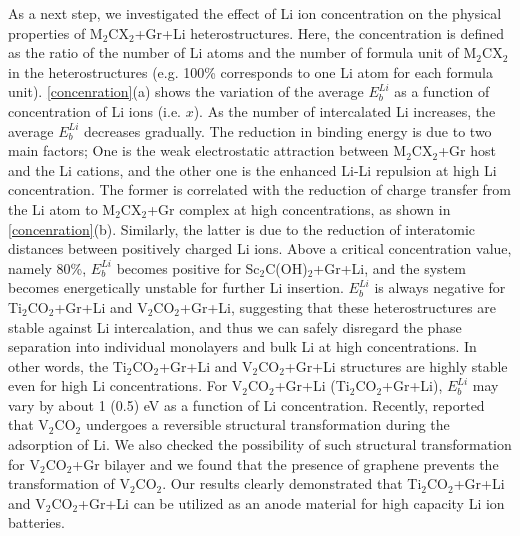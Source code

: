 As a next step, we investigated the effect of Li ion concentration on the physical properties of M$_2$CX$_2$+Gr+Li heterostructures. Here, the concentration is defined as the ratio of the number of Li atoms and the number of formula unit of M$_2$CX$_2$ in the heterostructures (e.g. 100\% corresponds to one Li atom for each formula unit). \autoref{concenration}(a) shows the variation of the average $E_{b}^{Li}$ as a function of concentration of Li ions (i.e. $x$). As the number of intercalated Li increases,  the average $E_{b}^{Li}$ decreases gradually. The reduction in binding energy is due to two main factors; One is the weak electrostatic attraction between M$_2$CX$_2$+Gr host and the Li cations, and the other one is the enhanced Li-Li repulsion at high Li concentration. The former is correlated with the reduction of charge transfer from the Li atom to M$_2$CX$_2$+Gr complex at high concentrations, as shown in \autoref{concenration}(b). Similarly, the latter is due to the reduction of interatomic distances between positively charged Li ions. Above a critical concentration value, namely 80\%,  $E_{b}^{Li}$ becomes positive for Sc$_2$C(OH)$_2$+Gr+Li, and the system becomes energetically unstable for further Li insertion. $E_{b}^{Li}$ is always negative for Ti$_2$CO$_2$+Gr+Li and V$_2$CO$_2$+Gr+Li, suggesting that these heterostructures are stable against Li intercalation, and thus we can safely disregard the phase separation into individual monolayers and bulk Li at high concentrations. In other words, the Ti$_2$CO$_2$+Gr+Li and V$_2$CO$_2$+Gr+Li structures are highly stable even for high Li concentrations. For V$_2$CO$_2$+Gr+Li (Ti$_2$CO$_2$+Gr+Li), $E_{b}^{Li}$ may vary by about 1 (0.5) eV as a function of Li concentration. Recently, \citet{doi:10.1021/acsami.5b03863}reported that V$_2$CO$_2$ undergoes a reversible structural transformation during the adsorption of Li. We also checked the possibility of such structural transformation for V$_2$CO$_2$+Gr bilayer and we found that the presence of graphene prevents the transformation of V$_2$CO$_2$. Our results clearly demonstrated that Ti$_2$CO$_2$+Gr+Li and V$_2$CO$_2$+Gr+Li can be utilized as an anode material for high capacity Li ion batteries.


